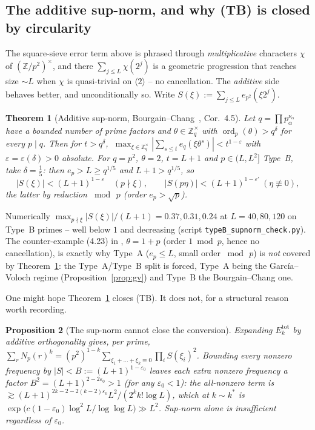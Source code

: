 \documentclass[11pt]{article}
\theoremstyle{plain}
\newtheorem{theorem}{Theorem}[section]
\newtheorem{proposition}[theorem]{Proposition}
\theoremstyle{definition}
\theoremstyle{remark}
\newcommand{\Z}{\mathbb{Z}}
\newcommand{\ord}{\operatorname{ord}}
\newcommand{\ep}{e_p}
\begin{document}
\subsection{The additive sup-norm, and why (TB) is closed by circularity}\label{sec:bc}

The square-sieve error term above is phrased through \emph{multiplicative}
characters $\chi$ of $(\Z/p^2)^\times$, and there $\sum_{j\le L}\chi(2^j)$ is a
geometric progression that reaches size $\sim L$ when $\chi$ is quasi-trivial on
$\langle2\rangle$ -- no cancellation. The \emph{additive} side behaves better,
and unconditionally so. Write $S(\xi):=\sum_{j\le L}e_{p^2}(\xi2^j)$.

\begin{theorem}[Additive sup-norm, Bourgain--Chang~\cite{BourgainChang2006}, Cor.~4.5]\label{thm:bc}
Let $q=\prod p_\alpha^{\nu_\alpha}$ have a bounded number of prime factors and
$\theta\in\Z_q^\times$ with $\ord_{p}(\theta)>q^\delta$ for every $p\mid q$. Then
for $t>q^\delta$, $\ \max_{\xi\in\Z_q^\times}|\sum_{s\le t}e_q(\xi\theta^s)|<t^{1-\varepsilon}$
with $\varepsilon=\varepsilon(\delta)>0$ absolute. For $q=p^2$, $\theta=2$,
$t=L+1$ and $p\in(L,L^2]$ Type~B, take $\delta=\tfrac15$: then $\ep>L\ge q^{1/5}$
and $L+1>q^{1/5}$, so \[|S(\xi)|<(L+1)^{1-\varepsilon}\quad(p\nmid\xi),\qquad
|S(p\eta)|<(L+1)^{1-\varepsilon'}\ (\eta\not\equiv0),\] the latter by reduction
$\bmod\,p$ \textup{(}order $\ep>\sqrt p$\textup{)}.
\end{theorem}

Numerically $\max_{p\nmid\xi}|S(\xi)|/(L+1)=0.37,0.31,0.24$ at $L=40,80,120$ on
Type~B primes -- well below $1$ and decreasing (script
\texttt{typeB\_supnorm\_check.py}). The counter-example (4.23) in \cite{BourgainChang2006},
$\theta=1+p$ (order $1\bmod p$, hence no cancellation), is exactly why Type~A
($\ep\le L$, small order $\bmod\,p$) is \emph{not} covered by
Theorem~\ref{thm:bc}: the Type~A/Type~B split is forced, Type~A being the
García--Voloch regime (Proposition~\ref{prop:gv}) and Type~B the Bourgain--Chang one.

One might hope Theorem~\ref{thm:bc} closes (TB). It does not, for a structural
reason worth recording.

\begin{proposition}[The sup-norm cannot close the conversion]\label{prop:block}
Expanding $E_k^{\mathrm{tot}}$ by additive orthogonality gives, per prime,
$\sum_rN_p(r)^k=(p^2)^{1-k}\sum_{\xi_1+\dots+\xi_k\equiv0}\prod_iS(\xi_i)^2$.
Bounding every nonzero frequency by $|S|<B:=(L+1)^{1-\varepsilon_0}$ leaves each
extra nonzero frequency a factor $B^2=(L+1)^{2-2\varepsilon_0}>1$ \textup{(}for any
$\varepsilon_0<1$\textup{)}: the all-nonzero term is $\gtrsim
(L+1)^{2k-2-2(k-2)\varepsilon_0}L^2/(2^kk!\log L)$, which at $k\sim k^\ast$ is
$\exp\!\big(c(1-\varepsilon_0)\log^2L/\log\log L\big)\gg L^2$. Sup-norm alone is
insufficient regardless of $\varepsilon_0$.
\end{proposition}
\end{document}
